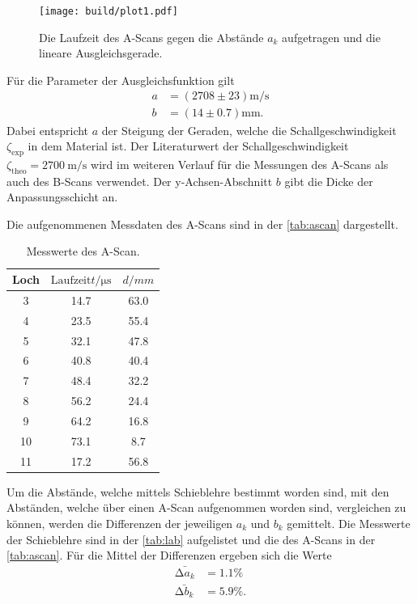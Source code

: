 \begin{figure}[H]
	\texttt{[image: build/plot1.pdf]}
	\captionsetup{width=0.765\linewidth}
	\caption{Die Laufzeit des A-Scans gegen die Abstände $a_k$ aufgetragen und die lineare Ausgleichsgerade.}
	\label{fig:plot1}
\end{figure}

Für die Parameter der Ausgleichsfunktion gilt
\begin{align*}
    a &= \left(2708 \pm 23\right) \si{\meter \per \second}\\
    b &= \left(14 \pm 0.7\right) \si{\milli\meter}.
\end{align*}
Dabei entspricht $a$ der Steigung der Geraden, welche die Schallgeschwindigkeit $\zeta_{\text{exp}}$ in dem Material ist.
Der Literaturwert der Schallgeschwindigkeit $\zeta_{\text{theo}} = \SI{2700}{\meter\per\second}$ \cite{doppler}wird im weiteren Verlauf für die 
Messungen des A-Scans als auch des B-Scans verwendet.
Der y-Achsen-Abschnitt $b$ gibt die Dicke der Anpassungsschicht an. 

Die aufgenommenen Messdaten des A-Scans sind in der \autoref{tab:ascan} dargestellt.
\begin{table}[H]
    \centering
    \caption{Messwerte des A-Scan.}
    \label{tab:ascan}
\begin{tabular}{c c c}
    \toprule
    Loch & $\text{Laufzeit} t / \si{\micro\second} $ & $ d/ \si{mm}$\\
    \midrule
     3 & 14.7 & 63.0 \\
     4 & 23.5 & 55.4 \\
     5 & 32.1 & 47.8 \\
     6 & 40.8 & 40.4 \\
     7 & 48.4 & 32.2 \\
     8 & 56.2 & 24.4 \\
     9 & 64.2 & 16.8 \\
    10 & 73.1 &  8.7 \\
    11 & 17.2 & 56.8 \\
    \bottomrule
\end{tabular}
\end{table}

Um die Abstände, welche mittels Schieblehre bestimmt worden sind, mit den Abständen, welche über einen A-Scan aufgenommen worden sind,
vergleichen zu können, werden die Differenzen der jeweiligen $a_k$ und $b_k$ gemittelt.
Die Messwerte der Schieblehre sind in der \autoref{tab:lab} aufgelistet und die des A-Scans in der \autoref{tab:ascan}.
Für die Mittel der Differenzen ergeben sich die Werte
\begin{align*}
\bar{\increment a_k} &= 1.1\% \\
\bar{\increment b_k} &= 5.9\%.
\end{align*}

